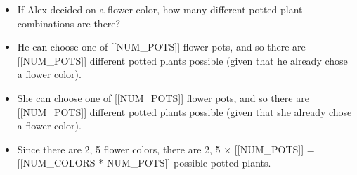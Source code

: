 \documentclass{article}
\begin{document}
\begin{itemize}
  \item If Alex decided on a flower color, how many different potted plant combinations are there?
  \item He can choose one of [[NUM\_POTS]] flower pots, and so there are [[NUM\_POTS]] different potted plants possible (given that he already chose a flower color).
  \item She can choose one of [[NUM\_POTS]] flower pots, and so there are [[NUM\_POTS]] different potted plants possible (given that she already chose a flower color).
  \item Since there are 2, 5 flower colors, there are 2, 5 $\times$ [[NUM\_POTS]] = [[NUM\_COLORS * NUM\_POTS]] possible potted plants.
\end{itemize}
\end{document}
